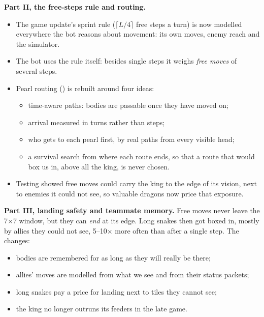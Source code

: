 \documentclass[11pt,a4paper]{article}
\newcommand{\code}[1]{\texttt{\detokenize{#1}}}
\begin{document}
\textbf{Part II, the free-steps rule and routing.}
\begin{itemize}
      \item The game update's sprint rule ($\lceil L/4\rceil$ free steps a turn) is now modelled everywhere the bot
            reasons about movement: its own moves, enemy reach and the simulator.
      \item The bot uses the rule itself: besides single steps it weighs \emph{free moves} of several steps.
      \item Pearl routing (\code{route.hpp}) is rebuilt around four ideas:
            \begin{itemize}
                  \item time-aware paths: bodies are passable once they have moved on;
                  \item arrival measured in turns rather than steps;
                  \item who gets to each pearl first, by real paths from every visible head;
                  \item a survival search from where each route ends, so that a route that would box us in, above
                        all the king, is never chosen.
            \end{itemize}
      \item Testing showed free moves could carry the king to the edge of its vision, next to enemies it could not see,
            so valuable dragons now price that exposure.
\end{itemize}
\textbf{Part III, landing safety and teammate memory.} Free moves never leave the 7$\times$7 window, but they can
\emph{end} at its edge. Long snakes then got boxed in, mostly by allies they could not see, 5--10$\times$ more often than
after a single step. The changes:
\begin{itemize}
      \item bodies are remembered for as long as they will really be there;
      \item allies' moves are modelled from what we see and from their status packets;
      \item long snakes pay a price for landing next to tiles they cannot see;
      \item the king no longer outruns its feeders in the late game.
\end{itemize}
\end{document}
